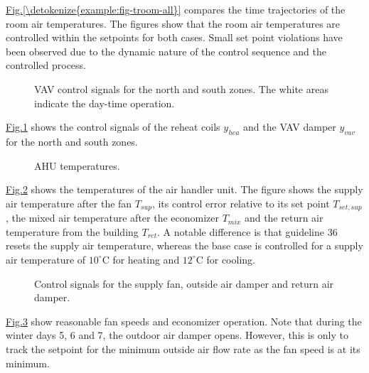 \documentclass[letterpaper,10pt, openany,english]{sphinxmanual}
\begin{document}
\hyperref[\detokenize{example:fig-troom-all}]{Fig.\@ \ref{\detokenize{example:fig-troom-all}}}
compares the time trajectories of the room air temperatures.
The figures show that the room air temperatures are controlled
within the setpoints for both cases. Small set point violations
have been observed due to the dynamic nature of the control sequence
and the controlled process.

\begin{figure}[htbp]
\centering
\capstart

\noindent{}
\caption{VAV control signals for the north and south zones.
The white areas indicate the day-time operation.}\label{\detokenize{example:id27}}\label{\detokenize{example:fig-vav-all}}\end{figure}

\hyperref[\detokenize{example:fig-vav-all}]{Fig.\@ \ref{\detokenize{example:fig-vav-all}}} shows the control signals of the reheat coils \(y_{hea}\)
and the VAV damper \(y_{vav}\)
for the north and south zones.

\begin{figure}[htbp]
\centering
\capstart

\noindent{}
\caption{AHU temperatures.}\label{\detokenize{example:id28}}\label{\detokenize{example:fig-tahu-all}}\end{figure}

\hyperref[\detokenize{example:fig-tahu-all}]{Fig.\@ \ref{\detokenize{example:fig-tahu-all}}} shows the temperatures of the air handler unit.
The figure shows
the supply air temperature after the fan \(T_{sup}\),
its control error relative to its set point \(T_{set,sup}\),
the mixed air temperature after the economizer \(T_{mix}\)
and the return air temperature from the building \(T_{ret}\).
A notable difference is that guideline 36 resets
the supply air temperature, whereas the base case is controlled
for a supply air temperature of \(10^\circ \mathrm C\)
for heating and \(12^\circ \mathrm C\) for cooling.

\begin{figure}[htbp]
\centering
\capstart

\noindent{}
\caption{Control signals for the supply fan, outside air damper and return air damper.}\label{\detokenize{example:id29}}\label{\detokenize{example:fig-flow-signals-all}}\end{figure}

\hyperref[\detokenize{example:fig-flow-signals-all}]{Fig.\@ \ref{\detokenize{example:fig-flow-signals-all}}} show reasonable fan speeds and economizer operation.
Note that during the winter days 5, 6 and 7, the outdoor air damper opens. However,
this is only to track the setpoint for the minimum outside air flow rate as the fan
speed is at its minimum.
\end{document}
